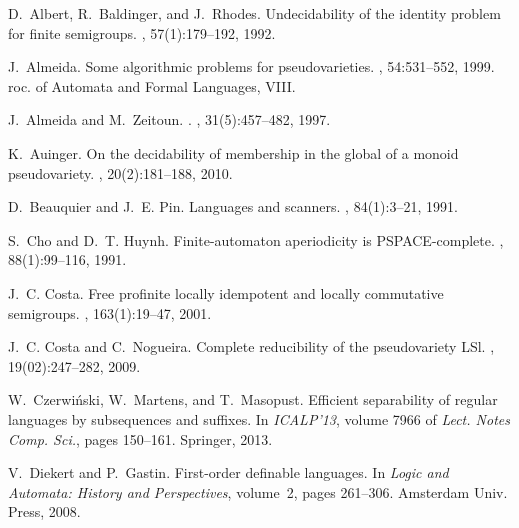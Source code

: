 \documentclass{CSML}
\theoremstyle{plain}
\begin{document}

\begin{thebibliography}{10}

D.~Albert, R.~Baldinger, and J.~Rhodes.
\newblock Undecidability of the identity problem for finite semigroups.
, 57(1):179--192, 1992.

J.~Almeida.
\newblock Some algorithmic problems for pseudovarieties.
, 54:531--552, 1999.
roc. of {Automata and Formal Languages, VIII}.

J.~Almeida and M.~Zeitoun.
.
, 31(5):457--482, 1997.

K.~Auinger.
\newblock On the decidability of membership in the global of a monoid
  pseudovariety.
, 20(2):181--188, 2010.

D.~Beauquier and J.~E. Pin.
\newblock Languages and scanners.
, 84(1):3--21, 1991.

S.~Cho and D.~T. Huynh.
\newblock Finite-automaton aperiodicity is {PSPACE}-complete.
, 88(1):99--116, 1991.

J.~C. Costa.
\newblock Free profinite locally idempotent and locally commutative semigroups.
, 163(1):19--47, 2001.

J.~C. Costa and C.~Nogueira.
\newblock Complete reducibility of the pseudovariety {LSl}.
, 19(02):247--282, 2009.

W.~Czerwi\'nski, W.~Martens, and T.~Masopust.
\newblock Efficient separability of regular languages by subsequences and
  suffixes.
\newblock In {\em ICALP'13}, volume 7966 of {\em Lect. Notes Comp. Sci.}, pages
  150--161. Springer, 2013.

V.~Diekert and P.~Gastin.
\newblock First-order definable languages.
\newblock In {\em Logic and Automata: History and Perspectives}, volume~2,
  pages 261--306. Amsterdam Univ. Press, 2008.


\end{thebibliography}
\end{document}
